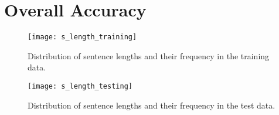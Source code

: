 \section{Overall Accuracy}

\begin{figure}[h]
    \centering
    \begin{minipage}{0.8\textwidth}
        \centering
        \texttt{[image: s\_length\_training]}
    \end{minipage}\hfill
    \caption{Distribution of sentence lengths and their frequency in the training data.}
    \label{fig:sentence_length_1}
\end{figure}

\begin{figure}[h]
    \centering
    \begin{minipage}{0.8\textwidth}
        \centering
        \texttt{[image: s\_length\_testing]}
    \end{minipage}
    \caption{Distribution of sentence lengths and their frequency in the test data.}
    \label{fig:sentence_length_2}
\end{figure}

